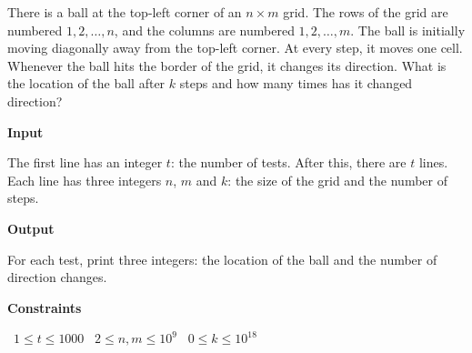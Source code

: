 There is a ball at the top-left corner of an $n \times m$ grid. The rows of the grid are numbered $1,2,\dots,n$, and the columns are numbered $1,2,\dots,m$.
The ball is initially moving diagonally away from the top-left corner. At every step, it moves one cell. Whenever the ball hits the border of the grid, it changes its direction.
What is the location of the ball after $k$ steps and how many times has it changed direction?

\vspace{0.3cm}\noindent\textbf{Input}

The first line has an integer $t$: the number of tests.
After this, there are $t$ lines. Each line has three integers $n$, $m$ and $k$: the size of the grid and the number of steps.

\vspace{0.3cm}\noindent\textbf{Output}

For each test, print three integers: the location of the ball and the number of direction changes.

\vspace{0.3cm}\noindent\textbf{Constraints}

\textbullet\ $1 \le t \le 1000$
\textbullet\ $2 \le n,m \le 10^9$
\textbullet\ $0 \le k \le 10^{18}$